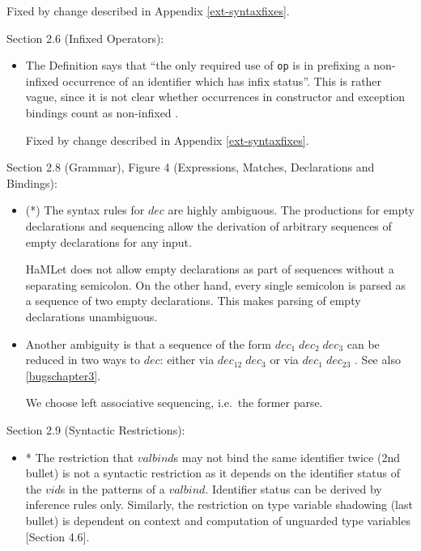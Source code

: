 \documentclass[twoside,titlepage]{article}
\begin{document}
\begin{appendix}
\begin{itemize}
Fixed by change described in Appendix \ref{ext-syntaxfixes}.
\end{itemize}


Section 2.6 (Infixed Operators):

\begin{itemize}

\item The Definition says that ``the only required use of {\tt op} is in prefixing a non-infixed occurrence of an identifier which has infix status''. This is rather vague, since it is not clear whether occurrences in constructor and exception bindings count as non-infixed \cite{mistakes}.

Fixed by change described in Appendix \ref{ext-syntaxfixes}.

\end{itemize}

Section 2.8 (Grammar), Figure 4 (Expressions, Matches, Declarations and Bindings):

\begin{itemize}

\item (*) The syntax rules for $\mathit{dec}$ are highly ambiguous. The productions for empty declarations and sequencing allow the derivation of arbitrary sequences of empty declarations for any input.

HaMLet does not allow empty declarations as part of sequences without a separating semicolon. On the other hand, every single semicolon is parsed as a sequence of two empty declarations. This makes parsing of empty declarations unambiguous.

\item Another ambiguity is that a sequence of the form $\mathit{dec}_1\;\mathit{dec}_2\;\mathit{dec}_3$ can be reduced in two ways to $\mathit{dec}$: either via $\mathit{dec}_{12}\;\mathit{dec}_3$ or via $\mathit{dec}_1\;\mathit{dec}_{23}$ \cite{mistakes}. See also \ref{bugschapter3}.

We choose left associative sequencing, i.e.\ the former parse.

\end{itemize}


Section 2.9 (Syntactic Restrictions):

\begin{itemize}

\item * The restriction that $\mathit{valbind}$s may not bind the same identifier twice (2nd bullet) is not a syntactic restriction as it depends on the identifier status of the $\mathit{vid}$s in the patterns of a $\mathit{valbind}$. Identifier status can be derived by inference rules only. Similarly, the restriction on type variable shadowing (last bullet) is dependent on context and computation of unguarded type variables [Section 4.6].


\end{itemize}
\end{appendix}
\end{document}

